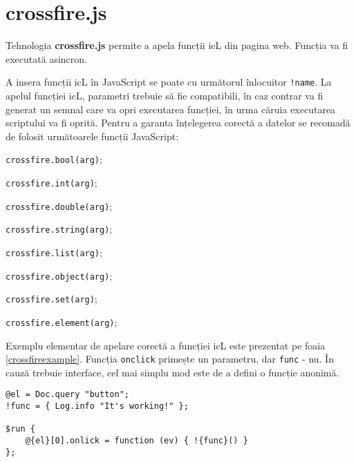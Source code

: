 \section{crossfire.js}

Tehnologia {\bf crossfire.js} permite a apela funcții icL din pagina web. Funcția va fi executată asincron.

A insera funcții icL în JavaScript se poate cu următorul înlocuitor \texttt{!{name}}. La apelul funcției icL, parametri trebuie să fie compatibili, în caz contrar va fi generat un semnal care va opri executarea funcției, în urma căruia executarea scriptului va fi oprită. Pentru a garanta înțelegerea corectă a datelor se recomadă de folosit următoarele funcții JavaScript:
\begin{icItems}
	\item \texttt{crossfire.bool(arg)};
	\item \texttt{crossfire.int(arg)};
	\item \texttt{crossfire.double(arg)};
	\item \texttt{crossfire.string(arg)};
	\item \texttt{crossfire.list(arg)};
	\item \texttt{crossfire.object(arg)};
	\item \texttt{crossfire.set(arg)};
	\item \texttt{crossfire.element(arg)};
\end{icItems}

Exemplu elementar de apelare corectă a funcției icL este prezentat pe foaia \ref{crossfireexample}. Funcția \texttt{onclick} primește un parametru, dar \texttt{func} - nu. În cauză trebuie interface, cel mai simplu mod este de a defini o funcție anonimă.

\begin{sourcecode}
\label{crossfireexample}
\begin{verbatim}
@el = Doc.query "button";
!func = { Log.info "It's working!" };

$run {
	@{el}[0].onlick = function (ev) { !{func}() }
};
\end{verbatim}
\end{sourcecode}

